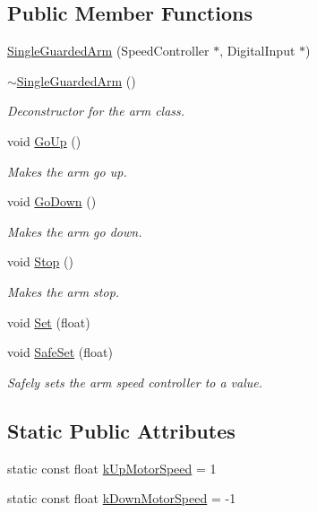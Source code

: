 \subsection*{\-Public \-Member \-Functions}
\begin{DoxyCompactItemize}
\item 
\hyperlink{class_single_guarded_arm_a8098cf7da4e174fac4b78209a0c0bc3c}{\-Single\-Guarded\-Arm} (\-Speed\-Controller $\ast$, \-Digital\-Input $\ast$)
\item 
\hyperlink{class_single_guarded_arm_ab16452596112f0eeb85922fcdc45fb8d}{$\sim$\-Single\-Guarded\-Arm} ()
\begin{DoxyCompactList}\small\item\em \-Deconstructor for the arm class. \end{DoxyCompactList}\item 
void \hyperlink{class_single_guarded_arm_aaa7b3de4ab81cca483af88886302ca07}{\-Go\-Up} ()
\begin{DoxyCompactList}\small\item\em \-Makes the arm go up. \end{DoxyCompactList}\item 
void \hyperlink{class_single_guarded_arm_aef02c8ff20f127caaf8dcb8e5f45a21c}{\-Go\-Down} ()
\begin{DoxyCompactList}\small\item\em \-Makes the arm go down. \end{DoxyCompactList}\item 
void \hyperlink{class_single_guarded_arm_ae9ac38ab7f932c04dc8753dd9fd6e460}{\-Stop} ()
\begin{DoxyCompactList}\small\item\em \-Makes the arm stop. \end{DoxyCompactList}\item 
void \hyperlink{class_single_guarded_arm_a341049a51ada6d13faf08a43c476d4d1}{\-Set} (float)
\item 
void \hyperlink{class_single_guarded_arm_a0e558d1874861458b8cc9354eebb620b}{\-Safe\-Set} (float)
\begin{DoxyCompactList}\small\item\em \-Safely sets the arm speed controller to a value. \end{DoxyCompactList}\end{DoxyCompactItemize}
\subsection*{\-Static \-Public \-Attributes}
\begin{DoxyCompactItemize}
\item 
static const float \hyperlink{class_single_guarded_arm_aa442ed29c8e99b475a4f46ecac051544}{k\-Up\-Motor\-Speed} = 1
\item 
static const float \hyperlink{class_single_guarded_arm_a8ea1ee43ded38095030020bb546dc62e}{k\-Down\-Motor\-Speed} = -\/1
\end{DoxyCompactItemize}
